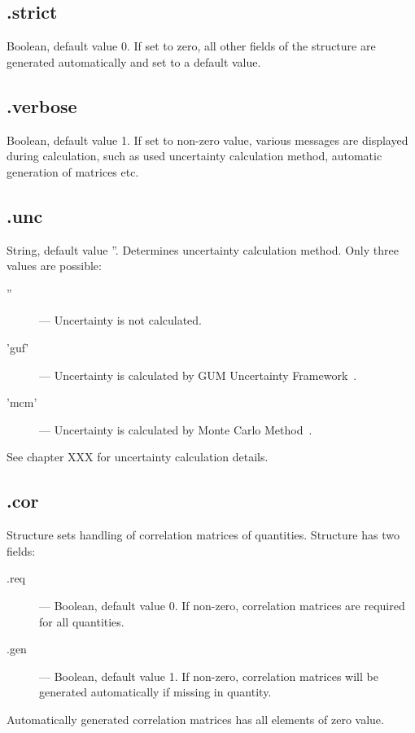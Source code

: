 \documentclass[12pt]{article} %
\begin{document}
\subsection{\textsf{.strict}} %
Boolean, default value 0. If set to zero, all other fields of the structure are generated
automatically and set to a default value.

\subsection{\textsf{.verbose}} %
Boolean, default value 1. If set to non-zero value, various messages are displayed during
calculation, such as used uncertainty calculation method, automatic generation of matrices etc.

\subsection{\textsf{.unc}} %
String, default value ''. Determines uncertainty calculation method. Only three values are possible:
\begin{description}
        \item [\textsf{''}] ---  Uncertainty is not calculated.
        \item [\textsf{'guf'}] ---  Uncertainty is calculated by GUM Uncertainty Framework~\cite{JCGM1995}.
        \item [\textsf{'mcm'}] ---  Uncertainty is calculated by Monte Carlo Method~\cite{JCGM2008}.
\end{description}
See chapter XXX %
for uncertainty calculation details.

\subsection{\textsf{.cor}} %
Structure sets handling of correlation matrices of quantities. Structure has two fields:
\begin{description}
        \item [\textsf{.req}] ---  Boolean, default value 0. If non-zero, correlation matrices are required for all quantities.
        \item [\textsf{.gen}] ---  Boolean, default value 1. If non-zero, correlation matrices will be generated
        automatically if missing in quantity.
\end{description}
Automatically generated correlation matrices has all elements of zero value.
\end{document}
